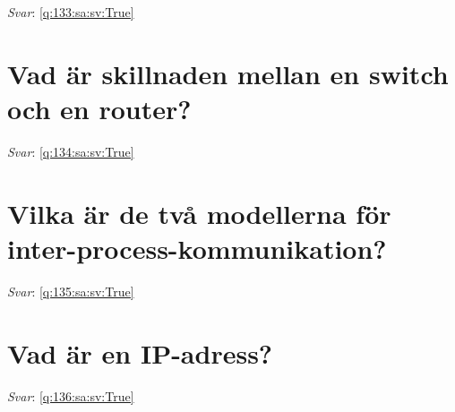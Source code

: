 \documentclass[a4paper,11pt,oneside]{book}
\begin{document}
\begin{sloppypar}
\label{q:133:sa:sv:False}

\vspace{2cm}

\noindent\makebox[\textwidth]{\hrulefill}

\vspace{1cm}

\textit{Svar}: \autoref{q:133:sa:sv:True}



\section{Vad \"ar skillnaden mellan en switch och en router?}

\label{q:134:sa:sv:False}

\vspace{2cm}

\noindent\makebox[\textwidth]{\hrulefill}

\vspace{1cm}

\textit{Svar}: \autoref{q:134:sa:sv:True}



\section{Vilka \"ar de tv\r{a} modellerna f\"or inter-process-kommunikation?}

\label{q:135:sa:sv:False}

\vspace{2cm}

\noindent\makebox[\textwidth]{\hrulefill}

\vspace{1cm}

\textit{Svar}: \autoref{q:135:sa:sv:True}



\section{Vad \"ar en IP-adress?}

\label{q:136:sa:sv:False}

\vspace{2cm}

\noindent\makebox[\textwidth]{\hrulefill}

\vspace{1cm}

\textit{Svar}: \autoref{q:136:sa:sv:True}




\end{sloppypar}
\end{document}
